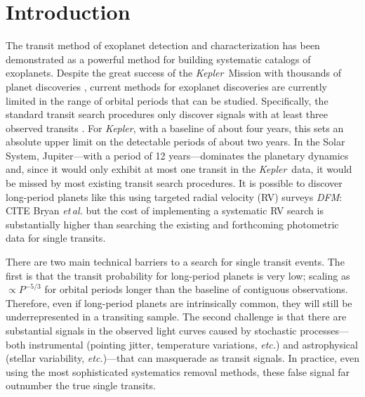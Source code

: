 \documentclass[12pt,preprint]{aastex}
\newcommand{\project}[1]{\textsl{#1}}
\newcommand{\kepler}{\project{Kepler}}
\newcommand{\foreign}[1]{\emph{#1}}
\newcommand{\etal}{\foreign{et\,al.}}
\newcommand{\etc}{\foreign{etc.}}
\newcommand{\todo}[3]{{\color{#2}\emph{#1}: #3}}
\newcommand{\dfmtodo}[1]{\todo{DFM}{red}{#1}}
\newcommand{\period}{{\ensuremath{P}}}
\begin{document}
\section{Introduction}

The transit method of exoplanet detection and characterization has been
demonstrated as a powerful method for building systematic catalogs of
exoplanets.
Despite the great success of the \kepler\ Mission with thousands of planet
discoveries \citep{Burke:2014, Rowe:2015}, current methods for exoplanet
discoveries are currently limited in the range of orbital periods that can be
studied.
Specifically, the standard transit search procedures only discover signals
with at least three observed transits \citep[for example][]{Petigura:2013,
Burke:2014, Rowe:2015}.
For \kepler, with a baseline of about four years, this sets an absolute upper
limit on the detectable periods of about two years.
In the Solar System, Jupiter---with a period of 12 years---dominates the
planetary dynamics and, since it would only exhibit at most one transit in the
\kepler\ data, it would be missed by most existing transit search procedures.
It is possible to discover long-period planets like this using targeted radial
velocity (RV) surveys \citep[for example][]{Butler:2006, Knutson:2014}
\dfmtodo{CITE Bryan \etal} but the cost of implementing a systematic RV search
is substantially higher than searching the existing and forthcoming
photometric data for single transits.

There are two main technical barriers to a search for single transit events.
The first is that the transit probability for long-period planets is very low;
scaling as $\propto\period^{-5/3}$ for orbital periods longer than the
baseline of contiguous observations.
Therefore, even if long-period planets are intrinsically common, they will
still be underrepresented in a transiting sample.
The second challenge is that there are substantial signals in the observed
light curves caused by stochastic processes---both instrumental
(pointing jitter, temperature variations, \etc) and astrophysical (stellar
variability, \etc)---that can masquerade as transit signals.
In practice, even using the most sophisticated systematics removal methods,
these false signal far outnumber the true single transits.
\end{document}
